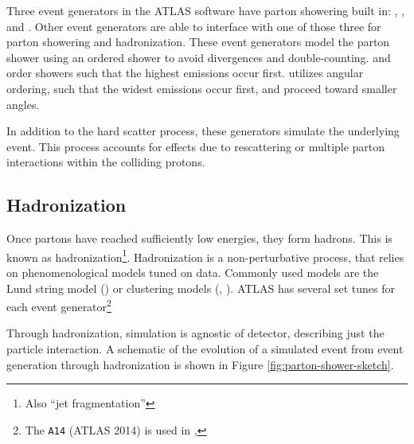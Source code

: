 Three event generators in the ATLAS software have parton showering built in: \PYTHIA, \HERWIG, and \SHERPA. Other event generators are able to interface with one of those three for parton showering and hadronization. These event generators model the parton shower using an ordered shower to avoid divergences and double-counting. \PYTHIA and \SHERPA order showers such that the highest \pt emissions occur first. \HERWIG utilizes angular ordering, such that the widest emissions occur first, and proceed toward smaller angles.

In addition to the hard scatter process, these generators simulate the underlying event. This process accounts for effects due to rescattering or multiple parton interactions within the colliding protons.

\subsection{Hadronization} \label{ssec:hadronization}
Once partons have reached sufficiently low energies, they form hadrons. This is known as hadronization\footnote{Also ``jet fragmentation''}. Hadronization is a non-perturbative process, that relies on phenomenological models tuned on data. Commonly used models are the Lund string model \cite{lund-string} (\PYTHIA) or clustering models \cite{clustering-hadronization} (\HERWIG, \SHERPA). ATLAS has several set tunes for each event generator\footnote{The \texttt{A14} (ATLAS 2014) is used in \peight, }

Through hadronization, simulation is agnostic of detector, describing just the particle interaction. A schematic of the evolution of a simulated event from event generation through hadronization is shown in Figure \ref{fig:parton-shower-sketch}.

